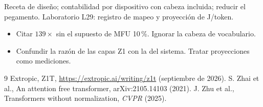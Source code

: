 \documentclass[11pt,a4paper]{article}
\begin{document}
\begin{aplicacion}
Receta de diseño; contabilidad por dispositivo con cabeza incluida; reducir el pegamento. Laboratorio L29: registro de mapeo y proyección de J/token.
\end{aplicacion}

\begin{error}
\begin{itemize}[nosep]
\item Citar $139\times$ sin el supuesto de MFU 10\,\%. \quad Ignorar la cabeza de vocabulario.
\item Confundir la razón de las capas Z1 con la del sistema. \quad Tratar proyecciones como mediciones.
\end{itemize}
\end{error}

\begin{thebibliography}{9}\small
{} Extropic, Z1T, \url{https://extropic.ai/writing/z1t} (septiembre de 2026).
 S. Zhai et al., An attention free transformer, arXiv:2105.14103 (2021).
 J. Zhu et al., Transformers without normalization, \emph{CVPR} (2025).
\end{thebibliography}
\end{document}
